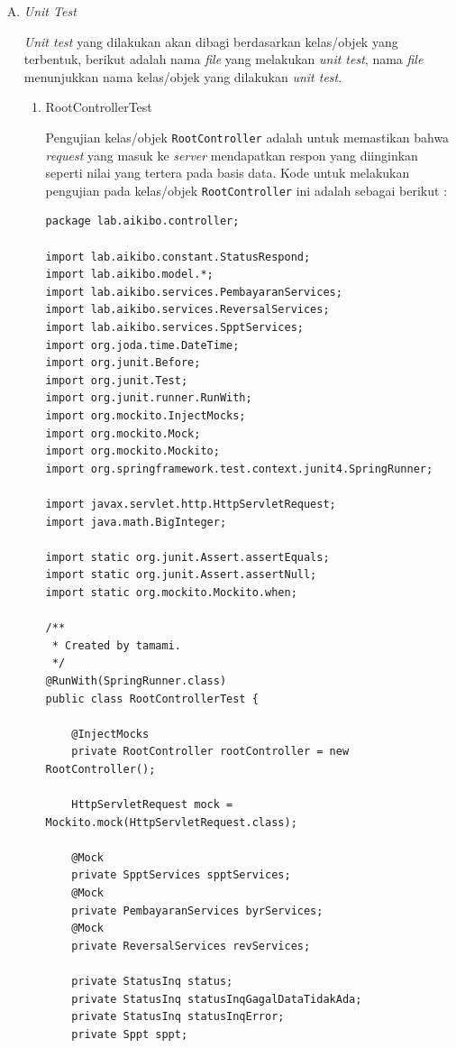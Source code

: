 \documentclass[pdftex,12pt, oneside]{article}
\begin{document}
\begin{enumerate}[A.]
  \item \textit{Unit Test}
  
  \textit{Unit test} yang dilakukan akan dibagi berdasarkan kelas/objek yang terbentuk, berikut adalah nama \textit{file} yang melakukan \textit{unit test}, nama \textit{file} menunjukkan nama kelas/objek yang dilakukan \textit{unit test}.
  
  \begin{enumerate}[1.]
    \item RootControllerTest
    
    Pengujian kelas/objek \texttt{RootController} adalah untuk memastikan bahwa \textit{request} yang masuk ke \textit{server} mendapatkan respon yang diinginkan seperti nilai yang tertera pada basis data. Kode untuk melakukan pengujian pada kelas/objek \texttt{RootController} ini adalah sebagai berikut :
    
    \begin{lstlisting}
package lab.aikibo.controller;

import lab.aikibo.constant.StatusRespond;
import lab.aikibo.model.*;
import lab.aikibo.services.PembayaranServices;
import lab.aikibo.services.ReversalServices;
import lab.aikibo.services.SpptServices;
import org.joda.time.DateTime;
import org.junit.Before;
import org.junit.Test;
import org.junit.runner.RunWith;
import org.mockito.InjectMocks;
import org.mockito.Mock;
import org.mockito.Mockito;
import org.springframework.test.context.junit4.SpringRunner;

import javax.servlet.http.HttpServletRequest;
import java.math.BigInteger;

import static org.junit.Assert.assertEquals;
import static org.junit.Assert.assertNull;
import static org.mockito.Mockito.when;

/**
 * Created by tamami.
 */
@RunWith(SpringRunner.class)
public class RootControllerTest {

    @InjectMocks
    private RootController rootController = new RootController();

    HttpServletRequest mock = Mockito.mock(HttpServletRequest.class);

    @Mock
    private SpptServices spptServices;
    @Mock
    private PembayaranServices byrServices;
    @Mock
    private ReversalServices revServices;

    private StatusInq status;
    private StatusInq statusInqGagalDataTidakAda;
    private StatusInq statusInqError;
    private Sppt sppt;


\end{lstlisting}
\end{enumerate}
\end{enumerate}
\end{document}
